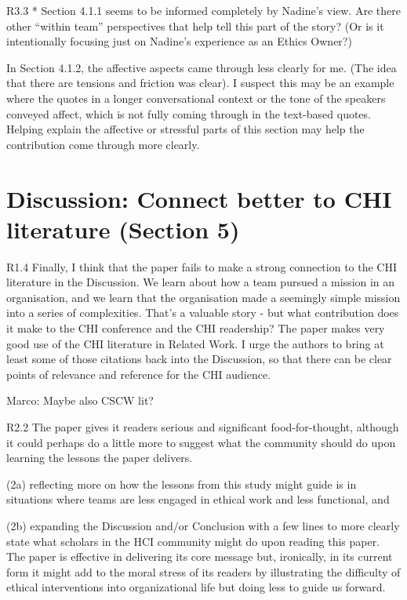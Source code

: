 R3.3
* Section 4.1.1 seems to be informed completely by Nadine’s view. Are there other “within team” perspectives that help tell this part of the story? (Or is it intentionally focusing just on Nadine’s experience as an Ethics Owner?)

In Section 4.1.2, the affective aspects came through less clearly for me. (The idea that there are tensions and friction was clear). I suspect this may be an example where the quotes in a longer conversational context or the tone of the speakers conveyed affect, which is not fully coming through in the text-based quotes. Helping explain the affective or stressful parts of this section may help the contribution come through more clearly.

\section{Discussion: Connect better to CHI literature (Section 5)}

R1.4
Finally, I think that the paper fails to make a strong connection to the CHI literature in the Discussion. We learn about how a team pursued a mission in an organisation, and we learn that the organisation made a seemingly simple mission into a series of complexities. That's a valuable story - but what contribution does it make to the CHI conference and the CHI readership? The paper makes very good use of the CHI literature in Related Work. I urge the authors to bring at least some of those citations back into the Discussion, so that there can be clear points of relevance and reference for the CHI audience.

Marco: Maybe also CSCW lit? 

R2.2
The paper gives it readers serious and significant food-for-thought, although it could perhaps do a little more to suggest what the community should do upon learning the lessons the paper delivers.

(2a) reflecting more on how the lessons from this study might guide is in situations where teams are less engaged in ethical work and less functional, and 

(2b) expanding the Discussion and/or Conclusion with a few lines to more clearly state what scholars in the HCI community might do upon reading this paper. The paper is effective in delivering its core message but, ironically, in its current form it might add to the moral stress of its readers by illustrating the difficulty of ethical interventions into organizational life but doing less to guide us forward.
